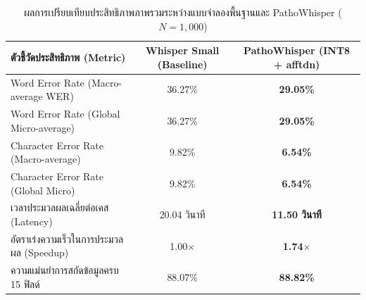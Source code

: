 
\begin{table}[htbp]
\centering
\caption{ผลการเปรียบเทียบประสิทธิภาพภาพรวมระหว่างแบบจำลองพื้นฐานและ PathoWhisper ($N=1,000$)}
\label{tab:headtohead_actual}
\small
\begin{tabular}{lcc}
\hline
\textbf{ตัวชี้วัดประสิทธิภาพ (Metric)} & \textbf{Whisper Small (Baseline)} & \textbf{PathoWhisper (INT8 + afftdn)} \\
\hline
Word Error Rate (Macro-average WER)    & 36.27\% & \textbf{29.05\%} \\
Word Error Rate (Global Micro-average) & 36.27\% & \textbf{29.05\%} \\
Character Error Rate (Macro-average)   & 9.82\% & \textbf{6.54\%} \\
Character Error Rate (Global Micro)    & 9.82\% & \textbf{6.54\%} \\
เวลาประมวลผลเฉลี่ยต่อเคส (Latency)    & 20.04 วินาที & \textbf{11.50 วินาที} \\
อัตราเร่งความเร็วในการประมวลผล (Speedup) & 1.00$\times$ & \textbf{1.74$\times$} \\
ความแม่นยำการสกัดข้อมูลครบ 15 ฟิลด์     & 88.07\% & \textbf{88.82\%} \\
\hline
\end{tabular}
\end{table}

